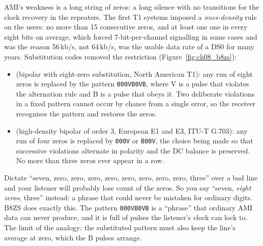 AMI's weakness is a long string of zeros: a long silence with no transitions for the
clock recovery in the repeaters. The first T1 systems imposed a \emph{ones-density} rule on
the users: no more than 15 consecutive zeros, and at least one one in every eight bits on
average, which forced 7-bit-per-channel signalling in some cases and was the reason
56\,kb/s, not 64\,kb/s, was the usable data rate of a DS0 for many years. Substitution codes
removed the restriction (Figure~\ref{fig:ch08_b8zs}):
\begin{itemize}
\item {} (bipolar with eight-zero substitution, North American T1): any run of eight
zeros is replaced by the pattern \texttt{000VB0VB}, where V is a pulse that violates the
alternation rule and B is a pulse that obeys it. Two deliberate violations in a fixed pattern
cannot occur by chance from a single error, so the receiver recognises the pattern and
restores the zeros.
\item {} (high-density bipolar of order 3, European E1 and E3, ITU-T G.703): any run
of four zeros is replaced by \texttt{000V} or \texttt{B00V}, the choice being made so that
successive violations alternate in polarity and the DC balance is preserved. No more than
three zeros ever appear in a row.
\end{itemize}


\begin{analogy}
Dictate ``seven, zero, zero, zero, zero, zero, zero, zero, zero, three'' over a bad line and
your listener will probably lose count of the zeros. So you say ``seven, \emph{eight zeros},
three'' instead: a phrase that could never be mistaken for ordinary digits. B8ZS does exactly
this. The pattern \texttt{000VB0VB} is a ``phrase'' that ordinary AMI data can never produce,
and it is full of pulses the listener's clock can lock to. The limit of the analogy: the
substituted pattern must also keep the line's average at zero, which the B pulses arrange.
\end{analogy}

